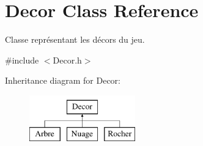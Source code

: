 \hypertarget{classDecor}{\section{Decor Class Reference}
\label{classDecor}
}


Classe représentant les décors du jeu.  




{\ttfamily \#include $<$Decor.\-h$>$}

Inheritance diagram for Decor\-:\begin{figure}[H]
\begin{center}
\leavevmode
\includegraphics[height=2.000000cm]{classDecor}
\end{center}
\end{figure}
